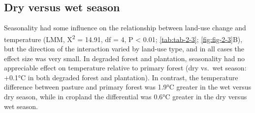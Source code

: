 \documentclass[12pt,a4paper,]{report}
\theoremstyle{definition}
\theoremstyle{definition}
\theoremstyle{definition}
\theoremstyle{remark}
\begin{document}
\subsection{Dry versus wet season}\label{dry-versus-wet-season}

Seasonality had some influence on the relationship between land-use
change and temperature (LMM, Χ\textsuperscript{2} = 14.91, df = 4, P
\textless{} 0.01; \autoref{tab:tab-2-3}; \autoref{fig:fig-2-3}B), but
the direction of the interaction varied by land-use type, and in all
cases the effect size was very small. In degraded forest and plantation,
seasonality had no appreciable effect on temperature relative to primary
forest (dry vs.~wet season: +0.1°C in both degraded forest and
plantation). In contrast, the temperature difference between pasture and
primary forest was 1.9°C greater in the wet versus dry season, while in
cropland the differential was 0.6°C greater in the dry versus wet
season.
\end{document}
